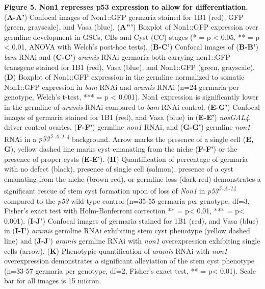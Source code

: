 \documentclass[12pt,twoside]{reedthesis}
\begin{document}
\textbf{Figure 5. Non1 represses p53 expression to allow for
differentiation.} (\textbf{A-A'}) Confocal images of Non1::GFP germaria
stained for 1B1 (red), GFP (green, grayscale), and Vasa (blue).
(\textbf{A'''}) Boxplot of Non1::GFP expression over germline development in
GSCs, CBs and Cyst (CC) stages (* = p \textless{} 0.05, ** = p \textless{} 0.01, ANOVA
with Welch's post-hoc tests). (\textbf{B-C'}) Confocal images of (\textbf{B-B'})
\emph{bam} RNAi and (\textbf{C-C'}) \emph{aramis} RNAi germaria both carrying non1::GFP
transgene stained for 1B1 (red), Vasa (blue), and Non1::GFP (green,
grayscale). (\textbf{D}) Boxplot of Non1::GFP expression in the germline
normalized to somatic Non1::GFP expression in \emph{bam} RNAi and \emph{aramis}
RNAi (n=24 germaria per genotype, Welch's t-test, *** = p \textless{} 0.001).
Non1 expression is significantly lower in the germline of \emph{aramis} RNAi
compared to \emph{bam} RNAi control. (\textbf{E-G'}) Confocal images of germaria
stained for 1B1 (red), and Vasa (blue) in (\textbf{E-E'}) \emph{nosGAL4}, driver
control ovaries, (\textbf{F-F'}) germline \emph{non1} RNAi, and (\textbf{G-G'})
germline \emph{non1} RNAi in a \emph{p53\textsuperscript{5-A-1-4}} background. Arrow marks the
presence of a single cell (\textbf{E, G}), yellow dashed line marks cyst
emanating from the niche (\textbf{F-F'}) or the presence of proper cysts
(\textbf{E-E'}). (\textbf{H}) Quantification of percentage of germaria with no
defect (black), presence of single cell (salmon), presence of a cyst
emanating from the niche (brown-red), or germline loss (dark red)
demonstrates a significant rescue of stem cyst formation upon of loss of
\emph{Non1} in \emph{p53\textsuperscript{5-A-14}} compared to the \emph{p53} wild type control (n=35-55
germaria per genotype, df=3, Fisher's exact test with Holm-Bonferroni
correction ** = p\textless{} 0.01, *** = p\textless{} 0.001). (\textbf{I-J'}) Confocal
images of germaria stained for 1B1 (red), and Vasa (blue) in (\textbf{I-I'})
\emph{aramis} germline RNAi exhibiting stem cyst phenotype (yellow dashed
line) and (\textbf{J-J}') \emph{aramis} germline RNAi with \emph{non1} overexpression
exhibiting single cells (arrow). (\textbf{K}) Phenotypic quantification of
\emph{aramis} RNAi with \emph{non1} overexpression demonstrates a significant
alleviation of the stem cyst phenotype (n=33-57 germaria per genotype,
df=2, Fisher's exact test, ** = p\textless{} 0.01). Scale bar for all images is
15 micron.
\end{document}
